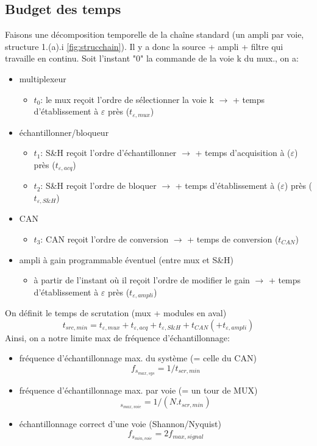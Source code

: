 \subsection{Budget des temps}
Faisons une décomposition temporelle de la chaîne standard (un ampli par voie, structure 1.(a).i \autoref{fig:strucchain}). Il y a donc la source + ampli + filtre qui travaille en continu. Soit l'instant "0" la commande de la voie k du mux., on a:
\begin{itemize}
	\item multiplexeur
	\begin{itemize}
		\item \(t_0\): le mux reçoit l'ordre de sélectionner la voie k \(\rightarrow\) + temps d'établissement à \(\varepsilon\) près (\(t_{\varepsilon,mux}\))
	\end{itemize}
	\item échantillonner/bloqueur
	\begin{itemize}
		\item \(t_1\): S\&H reçoit l'ordre d'échantillonner \(\rightarrow\) + temps d'acquisition à (\(\varepsilon\)) près (\(t_{\varepsilon,acq}\))
		\item \(t_2\): S\&H reçoit l'ordre de bloquer \(\rightarrow\) + temps d'établissement à (\(\varepsilon\)) près (\(t_{\varepsilon,S\&H}\))
	\end{itemize}
	\item CAN
	\begin{itemize}
		\item \(t_3\): CAN reçoit l'ordre de conversion \(\rightarrow\) + temps de conversion (\(t_{CAN}\))
	\end{itemize}
	\item ampli à gain programmable éventuel (entre mux et S\&H)
	\begin{itemize}
		\item à partir de l'instant où il reçoit l'ordre de modifier le gain \(\rightarrow\) + temps d'établissement à \(\varepsilon\) près (\(t_{\varepsilon,ampli}\))
	\end{itemize}
\end{itemize}
On définit le temps de scrutation (mux + modules en aval)
\[t_{src,min} = t_{\varepsilon,mux}+t_{\varepsilon,acq}+t_{\varepsilon,S\&H}+t_{CAN}(+t_{\varepsilon,ampli})\]
Ainsi, on a notre limite max de fréquence d'échantillonnage:
\begin{itemize}
	\item fréquence d'échantillonnage max. du système (= celle du CAN)
	\[f_{s_{max,sys}}=1/t_{scr,min}\]
	\item fréquence d'échantillonnage max. par voie (= un tour de MUX)
	\[_{s_{max,voie}}=1/(N.t_{scr,min})\]
	\item échantillonnage correct d'une voie (Shannon/Nyquist)
	\[f_{s_{min,voie}}=2f_{max,signal}\]
\end{itemize}
